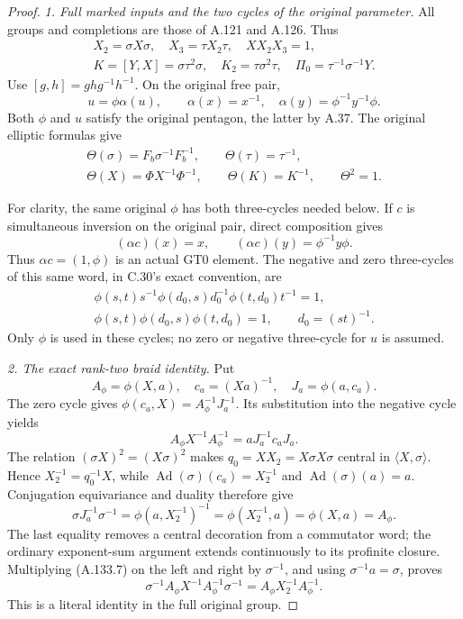 \begin{proof}
\emph{1. Full marked inputs and the two cycles of the original parameter.}
All groups and completions are those of A.121 and A.126. Thus
\[
\begin{gathered}
 X_2=\sigma X\sigma,\quad X_3=\tau X_2\tau,\quad
 XX_2X_3=1,\\
 K=[Y,X]=\sigma\tau^2\sigma,\quad K_2=\tau\sigma^2\tau,
 \quad\Pi_0=\tau^{-1}\sigma^{-1}Y.
\end{gathered}
\]
Use \([g,h]=ghg^{-1}h^{-1}\). On the original free pair,
\[
 u=\phi\alpha(u),\qquad
 \alpha(x)=x^{-1},\quad
 \alpha(y)=\phi^{-1}y^{-1}\phi.
 \tag{A.133.4}
\]
Both \(\phi\) and \(u\) satisfy the original pentagon, the latter
by A.37. The original elliptic formulas give
\[
\begin{gathered}
 \Theta(\sigma)=F_b\sigma^{-1}F_b^{-1},\qquad
 \Theta(\tau)=\tau^{-1},\\
 \Theta(X)=\Phi X^{-1}\Phi^{-1},\qquad
 \Theta(K)=K^{-1},\qquad\Theta^2=1.
\end{gathered}                                           \tag{A.133.5}
\]

For clarity, the same original \(\phi\) has both three-cycles
needed below. If \(c\) is simultaneous inversion on the original
pair, direct composition gives
\[
 (\alpha c)(x)=x,\qquad (\alpha c)(y)=\phi^{-1}y\phi.
\]
Thus \(\alpha c=(1,\phi)\) is an actual GT0 element. The
negative and zero three-cycles of this same word, in C.30's
exact convention, are
\[
\begin{gathered}
 \phi(s,t)s^{-1}\phi(d_0,s)d_0^{-1}\phi(t,d_0)t^{-1}=1,\\
 \phi(s,t)\phi(d_0,s)\phi(t,d_0)=1,
 \qquad d_0=(st)^{-1}.
\end{gathered}                                           \tag{A.133.6}
\]
Only \(\phi\) is used in these cycles; no zero or negative
three-cycle for \(u\) is assumed.

\par\smallskip\noindent\emph{2. The exact rank-two braid identity.}
Put
\[
 A_\phi=\phi(X,a),\quad c_a=(Xa)^{-1},\quad
 J_a=\phi(a,c_a).
\]
The zero cycle gives \(\phi(c_a,X)=A_\phi^{-1}J_a^{-1}\).
Its substitution into the negative cycle yields
\[
 A_\phi X^{-1}A_\phi^{-1}
                 =aJ_a^{-1}c_aJ_a.                    \tag{A.133.7}
\]
The relation \((\sigma X)^2=(X\sigma)^2\) makes
\(q_0=XX_2=X\sigma X\sigma\) central in
\(\langle X,\sigma\rangle\). Hence
\(X_2^{-1}=q_0^{-1}X\), while
\(\operatorname{Ad}(\sigma)(c_a)=X_2^{-1}\) and
\(\operatorname{Ad}(\sigma)(a)=a\).
Conjugation equivariance and duality therefore give
\[
 \sigma J_a^{-1}\sigma^{-1}
 =\phi(a,X_2^{-1})^{-1}
 =\phi(X_2^{-1},a)=\phi(X,a)=A_\phi.
\]
The last equality removes a central decoration from a commutator
word; the ordinary exponent-sum argument extends continuously to
its profinite closure. Multiplying (A.133.7) on the left and
right by \(\sigma^{-1}\), and using \(\sigma^{-1}a=\sigma\),
proves
\[
 \sigma^{-1}A_\phi X^{-1}A_\phi^{-1}\sigma^{-1}
       =A_\phi X_2^{-1}A_\phi^{-1}.
 \tag{A.133.8}
\]
This is a literal identity in the full original group.


\end{proof}
